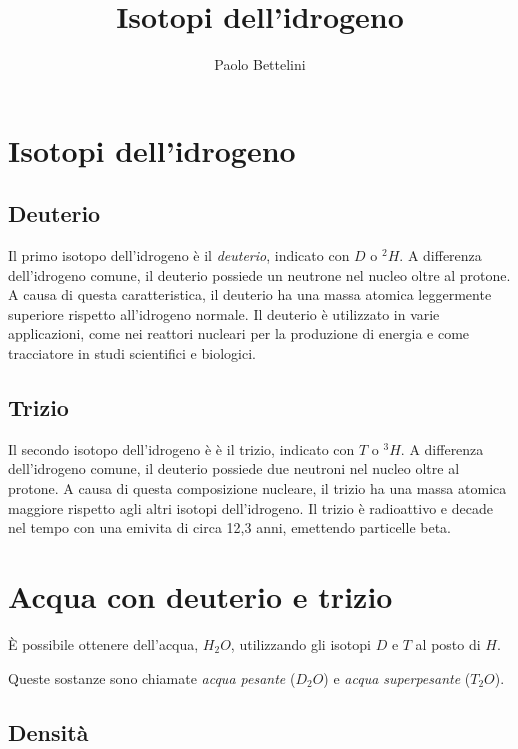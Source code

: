 \documentclass[a4paper]{article}
\title{Isotopi dell'idrogeno}
\author{Paolo Bettelini}
\date{}
\begin{document}
\maketitle
\tableofcontents


\section{Isotopi dell'idrogeno}

\subsection{Deuterio}

Il primo isotopo dell'idrogeno è il \textit{deuterio}, indicato con \(D\) o \(^2H\).
A differenza dell'idrogeno comune, il deuterio possiede un neutrone nel nucleo oltre al protone.
A causa di questa caratteristica, il deuterio ha una massa atomica leggermente superiore rispetto all'idrogeno normale.
Il deuterio è utilizzato in varie applicazioni, come nei reattori nucleari per la produzione di energia e come tracciatore in studi scientifici e biologici. 

\subsection{Trizio}

Il secondo isotopo dell'idrogeno è è il trizio, indicato con \(T\) o \(^3H\).
A differenza dell'idrogeno comune, il deuterio possiede due neutroni nel nucleo oltre al protone.
A causa di questa composizione nucleare, il trizio ha una massa atomica maggiore rispetto agli altri isotopi dell'idrogeno.
Il trizio è radioattivo e decade nel tempo con una emivita di circa 12,3 anni, emettendo particelle beta.

\section{Acqua con deuterio e trizio}

È possibile ottenere dell'acqua, \(H_2O\), utilizzando gli isotopi \(D\) e \(T\) al posto di \(H\).

Queste sostanze sono chiamate \textit{acqua pesante} (\(D_2O\)) e
\textit{acqua superpesante} (\(T_2O\)).

\subsection{Densità}
\end{document}
